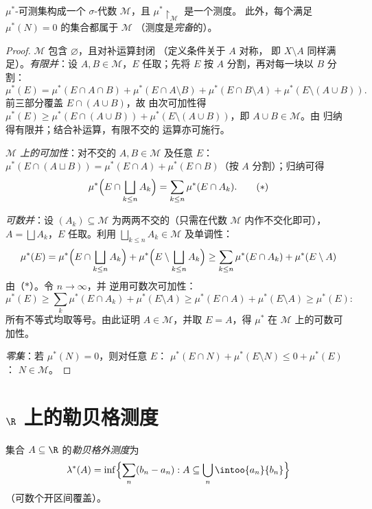 \begin{theorem}[卡拉西奥多里]\label{thm:b3:measure:caratheodory}
$\mu^*$-可测集构成一个 $\sigma$-代数 $\mathcal
M$，且 $\mu^*\restriction_{\mathcal M}$ 是一个测度。
此外，每个满足 $\mu^*(N) = 0$ 的集合都属于 $\mathcal M$
（测度是\emph{完备}的）。
\end{theorem}

\begin{proof}
$\mathcal M$ 包含 $\varnothing$，且对补运算封闭
（定义条件关于 $A$ 对称，
即 $X\setminus A$ 同样满足）。\emph{有限并}：设 $A, B \in \mathcal
M$，$E$ 任取；先将 $E$ 按 $A$ 分割，再对每一块以
$B$ 分割：
\[
\mu^*(E) = \mu^*(E\cap A\cap B) + \mu^*(E\cap A\setminus B) +
\mu^*(E\cap B\setminus A) + \mu^*(E\setminus(A\cup B)).
\]
前三部分覆盖 $E \cap (A \cup B)$，故
由次可加性得 $\mu^*(E) \geq \mu^*(E\cap(A\cup B)) +
\mu^*(E\setminus(A\cup B))$，即 $A \cup B \in \mathcal M$。由
归纳得有限并；结合补运算，有限不交的
运算亦可施行。

\emph{$\mathcal M$ 上的可加性}：对不交的 $A, B \in
\mathcal M$ 及任意 $E$：$\mu^*(E\cap(A\sqcup B)) = \mu^*(E\cap
A) + \mu^*(E \cap B)$（按 $A$ 分割）；归纳可得
\[
\mu^*\Bigl(E \cap \bigsqcup_{k\leq n}A_k\Bigr)
= \sum_{k\leq n}\mu^*(E\cap A_k).
\tag{$*$}
\]

\emph{可数并}：设 $(A_k) \subseteq \mathcal M$
为两两不交的（只需在代数
$\mathcal M$ 内作不交化即可），$A = \bigsqcup A_k$，$E$ 任取。利用
$\bigsqcup_{k\leq n}A_k \in \mathcal M$ 及单调性：
\[
\mu^*(E) = \mu^*\Bigl(E\cap\bigsqcup_{k\leq n}A_k\Bigr) +
\mu^*\Bigl(E\setminus\bigsqcup_{k\leq n}A_k\Bigr)
\geq \sum_{k \leq n}\mu^*(E\cap A_k) + \mu^*(E\setminus A)
\]
由（$*$）。令 $n \to \infty$，并
逆用可数次可加性：
\[
\mu^*(E) \geq \sum_{k}\mu^*(E\cap A_k) + \mu^*(E\setminus A)
\geq \mu^*(E \cap A) + \mu^*(E\setminus A) \geq \mu^*(E):
\]
所有不等式均取等号。由此证明 $A \in
\mathcal M$，并取 $E = A$，得
$\mu^*$ 在 $\mathcal M$ 上的可数可加性。

\emph{零集}：若 $\mu^*(N) = 0$，则对任意 $E$：
$\mu^*(E \cap N) + \mu^*(E\setminus N) \leq 0 + \mu^*(E)$：
$N \in \mathcal M$。
\end{proof}

\section{\texorpdfstring{$\R$}{R} 上的勒贝格测度}

\begin{definition}\label{def:b3:measure:lebesgueouter}
集合 $A
\subseteq \R$ 的\emph{勒贝格外测度}为
\[
\lambda^*(A) = \inf\Bigl\{\sum_{n} (b_n - a_n) :
A \subseteq \bigcup_n \intoo{a_n}{b_n}\Bigr\}
\]
（可数个开区间覆盖）。
\end{definition}

